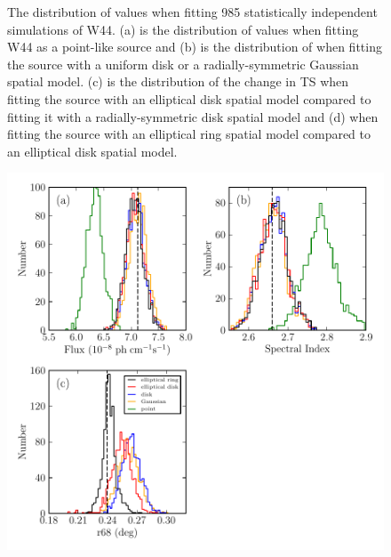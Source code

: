 \begin{figure}
    \fi
    \caption{
    The distribution of \ts values when fitting 985 statistically
    independent simulations of W44. (a) is the distribution of \ts values
    when fitting W44 as a point-like source and (b) is the
    distribution of \tsext when fitting the source with a uniform disk or a 
    radially-symmetric Gaussian
    spatial model. (c) is the distribution of the change in TS when
    fitting the source with an elliptical disk spatial model compared to
    fitting it with a radially-symmetric disk spatial model and (d) 
    when fitting the source with an elliptical ring spatial model compared
    to an elliptical disk spatial model.
    }
\end{figure}

\clearpage
\begin{figure}
    \ifcolorfigure
    \includegraphics{mc_plots/bias_w44sim_color.pdf}
    \else

\end{figure}

